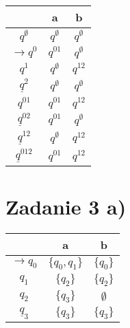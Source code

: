 \documentclass{article}
\begin{document}
\vspace{-1.8cm}
\begin{minipage}{.7\linewidth}
\centering
\begin{tabular}{ c | c | c }
  & a & b \\ 
\hline
$q^\emptyset$         & $q^\emptyset$   & $q^\emptyset$ \\  \hline
$\rightarrow q^0$     & $q^{01}$      & $q^\emptyset$ \\  \hline
$q^1$                 & $q^\emptyset$ & $q^{12}$ \\ \hline
$\underline q^2$      & $q^\emptyset$ & $q^\emptyset$ \\ \hline

$q^{01}$              & $q^{01}$      & $q^{12}$ \\ \hline
$\underline q^{02}$   & $q^{01}$      & $q^\emptyset$ \\ \hline
$\underline q^{12}$   & $q^\emptyset$ & $q^{12}$ \\ \hline

$\underline q^{012}$  & $q^{01}$      & $q^{12}$ \\ 

\end{tabular}
\end{minipage}

\section*{Zadanie 3 a)}

\begin{minipage}{.2\linewidth}
\centering
\begin{tabular}{ c | c | c }
  & a & b \\ 
\hline
$\rightarrow q_0$   & $\{q_0 , q_1\}$ & $\{q_0\}$ \\  \hline
$q_1$               & $\{q_2\}$       & $\{q_2\}$ \\ \hline
$q_2$               & $\{q_3\}$       & $\emptyset$\\ \hline
$\underline q_3$    & $\{q_3\}$       & $\{q_3\}$\\
\end{tabular}
\end{minipage}
\end{document}
